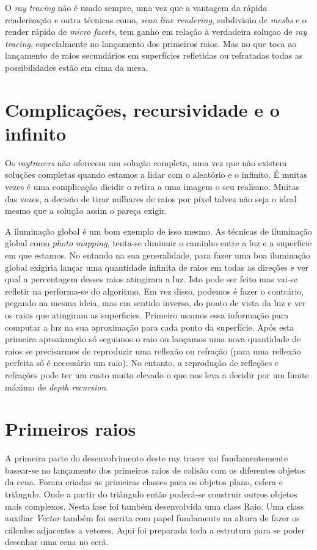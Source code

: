 \documentclass[12pt]{article}
\begin{document}
O \textit{ray tracing} não é usado sempre, uma vez que a vantagem da rápida renderização e outra técnicas como,\textit{ scan line rendering}, subdivisão de \textit{meshs} e o render rápido de \textit{micro facets}, tem ganho em relação à verdadeira soluçao de \textit{ray tracing}, especialmente no lançamento dos primeiros raios. Mas no que toca ao lançamento de raios secundários em superfícies refletidas ou refratadas todas as possibilidades estão em cima da mesa.

\section{Complicações, recursividade e o infinito}
\vspace{5 mm}
\hspace{8 mm}Os \textit{raytracers} não oferecem um solução completa, uma vez que não existem soluções completas quando estamos a lidar com o aleatório e o infinito. É muitas vezes é uma complicação dicidir o retira a uma imagem o seu realismo. Muitas das vezes, a decisão de tirar milhares de raios por píxel talvez não seja o ideal mesmo que a solução assim o pareça exigir.\newline

A iluminação global é um bom exemplo de isso mesmo. As técnicas de iluminação global como \textit{photo mapping}, tenta-se diminuir o caminho entre a luz e a superficie em que estamos. No entando na sua generalidade, para fazer uma boa iluminação global exigiria lançar uma quantidade infinita de raios em todas as direções e ver qual a percentagem desses raios atingiram a luz. Isto pode ser feito mas vai-se refletir na performa-se do algoritmo. Em vez disso, podemos é fazer o contrário, pegando na mesma ideia, mas em sentido inverso, do ponto de vista da luz e ver os raios que atingiram as superficies. Primeiro usamos essa informação para computar a luz na sua aproximação para cada ponto da superfície. Após esta primeira aproximação só seguimos o raio ou lançamos uma nova quantidade de raios se precisarmos de reproduzir uma reflexão ou refração (para uma reflexão perfeita só é necessário um raio). No entanto, a reprodução de refleções e refrações pode ter um custo muito elevado o que nos leva a decidir por um limite máximo de {\it depth recursion}.

\section{Primeiros raios}
\vspace{5 mm}
\hspace{8 mm}A primeira parte do desenvolvimento deste ray tracer vai fundamentemente basear-se no lançamento dos primeiros raios de colisão com os diferentes objetos da cena. Foram criadas as primeiras classes para os objetos plano, esfera e triângulo. Onde a partir do triângulo então poderá-se construir outros objetos mais complexos. Nesta fase foi também desenvolvida uma class Raio. Uma class auxiliar \textit{Vector} também foi escrita com papel fundamente na altura de fazer os cálculos adjacentes a vetores.
Aqui foi preparada toda a estrutura para se poder desenhar uma cena no ecrã. \newline
\end{document}
